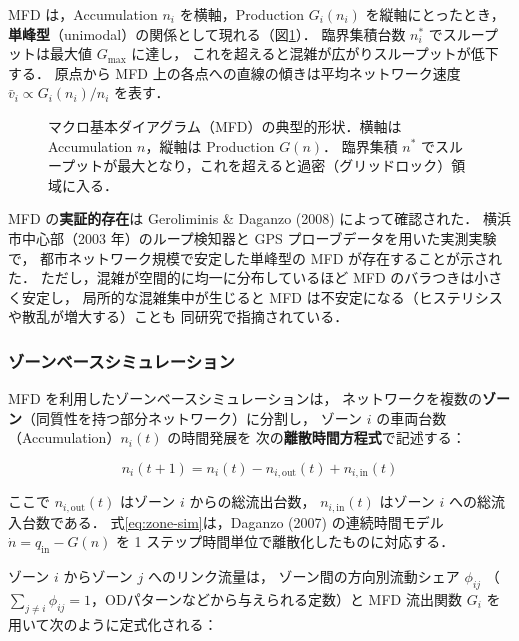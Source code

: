 MFD は，Accumulation $n_i$ を横軸，Production $G_i(n_i)$ を縦軸にとったとき，
\textbf{単峰型}（unimodal）の関係として現れる（図\ref{fig:mfd-concept}）．
臨界集積台数 $n_i^*$ でスループットは最大値 $G_{\max}$ に達し，
これを超えると混雑が広がりスループットが低下する．
原点から MFD 上の各点への直線の傾きは平均ネットワーク速度 $\bar{v}_i \propto G_i(n_i)/n_i$
を表す．

\begin{figure}[tb]
  \centering
  
  \caption{マクロ基本ダイアグラム（MFD）の典型的形状．横軸は Accumulation $n$，縦軸は Production $G(n)$．
           臨界集積 $n^*$ でスループットが最大となり，これを超えると過密（グリッドロック）領域に入る．}
  \label{fig:mfd-concept}
\end{figure}

MFD の\textbf{実証的存在}は Geroliminis \& Daganzo (2008) によって確認された\cite{Geroliminis2008}．
横浜市中心部（2003 年）のループ検知器と GPS プローブデータを用いた実測実験で，
都市ネットワーク規模で安定した単峰型の MFD が存在することが示された．
ただし，混雑が空間的に均一に分布しているほど MFD のバラつきは小さく安定し，
局所的な混雑集中が生じると MFD は不安定になる（ヒステリシスや散乱が増大する）ことも
同研究で指摘されている．

\subsubsection*{ゾーンベースシミュレーション}

MFD を利用したゾーンベースシミュレーションは，
ネットワークを複数の\textbf{ゾーン}（同質性を持つ部分ネットワーク）に分割し，
ゾーン $i$ の車両台数（Accumulation）$n_i(t)$ の時間発展を
次の\textbf{離散時間方程式}で記述する\cite{Daganzo2007}：

\begin{equation}
  n_i(t+1) = n_i(t) - n_{i,\text{out}}(t) + n_{i,\text{in}}(t)
  \label{eq:zone-sim}
\end{equation}

ここで $n_{i,\text{out}}(t)$ はゾーン $i$ からの総流出台数，
$n_{i,\text{in}}(t)$ はゾーン $i$ への総流入台数である．
式\eqref{eq:zone-sim}は，Daganzo (2007) の連続時間モデル
$\dot{n} = q_{\text{in}} - G(n)$ を 1 ステップ時間単位で離散化したものに対応する．

ゾーン $i$ からゾーン $j$ へのリンク流量は，
ゾーン間の方向別流動シェア $\phi_{ij}$
（$\sum_{j \neq i} \phi_{ij} = 1$，ODパターンなどから与えられる定数）と
MFD 流出関数 $G_i$ を用いて次のように定式化される：

